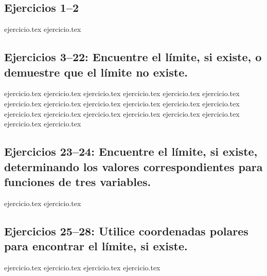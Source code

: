 
\subsection*{Ejercicios 1--2}
\begin{enumerate}
    {ejercicio.tex}
    {ejercicio.tex}
\end{enumerate}

\subsection*{Ejercicios 3--22: Encuentre el límite, si existe, o demuestre que el límite no existe.}
\begin{enumerate}
    \setcounter{enumi}{2}
    {ejercicio.tex}
    {ejercicio.tex}
    {ejercicio.tex}
    {ejercicio.tex}
    {ejercicio.tex}
    {ejercicio.tex}
    {ejercicio.tex}
    {ejercicio.tex}
    {ejercicio.tex}
    {ejercicio.tex}
    {ejercicio.tex}
    {ejercicio.tex}
    {ejercicio.tex}
    {ejercicio.tex}
    {ejercicio.tex}
    {ejercicio.tex}
    {ejercicio.tex}
    {ejercicio.tex}
    {ejercicio.tex}
    {ejercicio.tex}
\end{enumerate}

\subsection*{Ejercicios 23--24: Encuentre el límite, si existe, determinando los valores correspondientes para funciones de tres variables.}
\begin{enumerate}
    \setcounter{enumi}{22}
    {ejercicio.tex}
    {ejercicio.tex}
\end{enumerate}

\subsection*{Ejercicios 25--28: Utilice coordenadas polares para encontrar el límite, si existe.}
\begin{enumerate}
    \setcounter{enumi}{24}
    {ejercicio.tex}
    {ejercicio.tex}
    {ejercicio.tex}
    {ejercicio.tex}
\end{enumerate}

